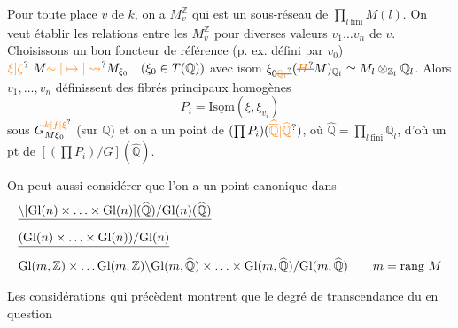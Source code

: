 Pour toute place $v$ de $k$, on a $M_v^{\mathbb Z}$ qui est
un sous-réseau de $\prod_{l\ \mathrm{fini}}M(l)$. On veut établir
les relations entre les $M_v^{\mathbb Z}$ pour diverses
valeurs $v_1\ldots v_n$ de $v$. Choisissons un
bon foncteur de référence (p. ex. défini par $v_0$)
$\unsure{\xi|\zeta}\ M\unsure{\sim|\mapsto|\rightsquigarrow} M_{\xi_0}\quad(\xi_0\in T(\mathbb Q))$ avec  isom 
$\xi_{0\deleted{\unsure{\mathbb Q_l}}}(\deleted{\unsure{H}}M)_{\mathbb Q_l}\simeq M_l\otimes_{\mathbb Z_l}\mathbb Q_l$. Alors $v_1,\ldots,v_n$ définissent des
fibrés principaux homogènes
\[
P_i=\underline{\mathrm{Isom}}(\xi,\xi_{v_i})
\]
sous $G_{M\xi_0}^{\unsure{k|f|\xi}}$ (sur $\mathbb Q$) et on a un
point de $(\prod P_i)(\unsure{\widehat{\overline{\mathbb Q}}|\widehat{\mathbb Q}})$, où $\widehat{\mathbb Q}=\prod_{l\ \mathrm{fini}}\mathbb Q_l$,
d'où un pt de $[(\prod P_i)/G](\widehat{\mathbb Q})$.

On peut aussi considérer que l'on a un
point canonique dans 
\[
\begin{aligned}
&\deleted{\backslash[\mathrm{Gl}(n)\times\ldots\times\mathrm{Gl}(n)](\widehat{\mathbb Q})/\mathrm{Gl}(n)(\widehat{\mathbb Q})}\\
&\deleted{(\mathrm{Gl}(n)\times\ldots\times\mathrm{Gl}(n))/\mathrm{Gl}(n)}\\
&\mathrm{Gl}(m,\mathbb Z)\times\ldots\mathrm{Gl}(m,\mathbb Z)\backslash
\mathrm{Gl}(m,\widehat{\mathbb Q})\times\ldots\times\mathrm{Gl}(m,\widehat{\mathbb Q})/
\mathrm{Gl}(m,\widehat{\mathbb Q})\qquad m=\text{rang }M
\end{aligned}
\]

Les considérations qui précèdent montrent que
le degré de transcendance du  en question
